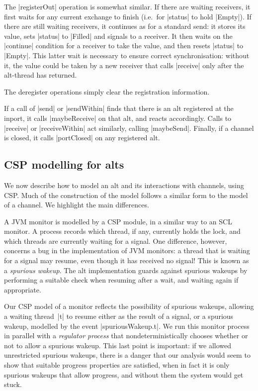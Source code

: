 The |registerOut| operation is somewhat similar.  If there are waiting
receivers, it first waits for any current exchange to finish (i.e.~for
|status| to hold |Empty|).  If there are still waiting receivers, it continues
as for a standard send: it stores its value, sets |status| to |Filled| and
signals to a receiver.  It then waits on the |continue| condition for a
receiver to take the value, and then resets |status| to |Empty|.  This latter
wait is necessary to ensure correct synchronisation: without it, the value
could be taken by a new receiver that calls |receive| only after the
alt-thread has returned.

The deregister operations simply clear the registration information.

If a call of |send| or |sendWithin| finds that there is an alt registered at
the inport, it calls |maybeReceive| on that alt, and reacts accordingly.
Calls to |receive| or |receiveWithin| act similarly, calling |maybeSend|.  
%
Finally, if a channel is closed, it calls |portClosed| on any registered alt. 


\subsection{CSP modelling for alts}

\inlineCSP

We now describe how to model an alt and its interactions with channels, using
CSP\@.  Much of the construction of the model follows a similar form to the
model of a channel.  We highlight the main differences. 

A JVM monitor is modelled by a CSP module, in a similar way to an SCL monitor.
A process records which thread, if any, currently holds the lock, and which
threads are currently waiting for a signal.  One difference, however, concerns
a bug in the implementation of JVM monitors: a thread that is waiting for a
signal may resume, even though it has received no signal!  This is known as a
\emph{spurious wakeup}.  The alt implementation guards against spurious
wakeups by performing a suitable check when resuming after a wait, and waiting
again if appropriate.

Our CSP model of a monitor reflects the possibility of spurious wakeups,
allowing a waiting thread~|t| to resume either as the result of a signal, or a
spurious wakeup, modelled by the event |spuriousWakeup.t|.  We run this
monitor process in parallel with a \emph{regulator process}  that nondeterministically chooses whether or not
to allow a spurious wakeup.  This last point is important: if we allowed
unrestricted spurious wakeups, there is a danger that our analysis would seem
to show that suitable progress properties are satisfied, when in fact it is
only spurious wakeups that allow progress, and without them the system would
get stuck.

